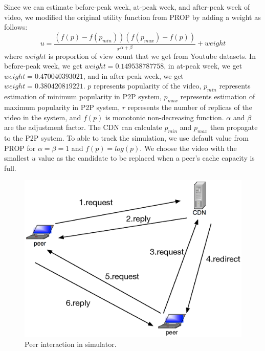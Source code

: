 \documentclass[10pt,final,journal,a4paper]{IEEEtran}
\begin{document}
Since we can estimate before-peak week, at-peak week, and after-peak week of video, we modified the original utility function from PROP by adding a weight as follows:
\begin{equation}
u = \frac{ (f(p) - f(p_{min})) (f(p_{max}) - f(p)) }{r^{\alpha + \beta}} + weight
\end{equation}
where $weight$ is proportion of view count that we get from Youtube datasets.  
In before-peak week, we get $weight=0.149538787758 $,  in at-peak week, we get $weight=0.470040393021$, and in after-peak week, we get $weight=0.380420819221$.
$p$ represents popularity of the video, $p_{min}$ represents estimation of minimum popularity in P2P system, $p_{max}$ represents estimation of maximum popularity in P2P system, $r$ represents the number of replicas of the video in the system, and $f(p)$ is monotonic non-decreasing function.
$\alpha$ and $\beta$ are the adjustment factor.
The CDN can calculate $p_{min}$ and $p_{max}$ then propagate to the P2P system.
To able to track the simulation, we use default value from PROP for $\alpha=\beta=1$ and $f(p)=log (p)$.
We choose the video with the smallest $u$ value as the candidate to be replaced when a peer's cache capacity is full.

\begin{figure}[!t]
\begin{center}
\includegraphics[scale=0.4]{graphs/p2p-system-description.eps}
\end{center}
\caption{Peer interaction in simulator.}
\label{fig:p2pcdninteractioninsimulator}
\end{figure} 
\end{document}
